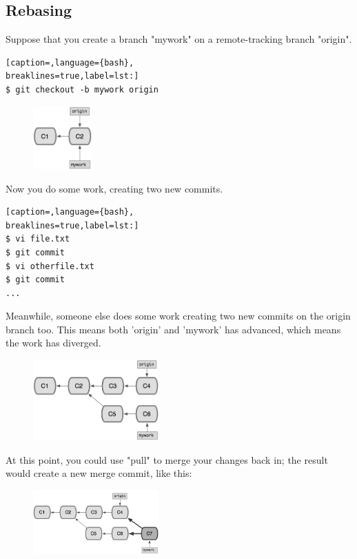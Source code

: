 \subsection{Rebasing}
Suppose that you create a branch "mywork" on a remote-tracking branch "origin".
\lstset{basicstyle=\scriptsize, numbers=none, captionpos=b, tabsize=4}
\begin{lstlisting}[caption=,language={bash},
breaklines=true,label=lst:]
$ git checkout -b mywork origin
\end{lstlisting}

\begin{figure}[h]
\centering
\includegraphics[width=0.20\textwidth]{content/git/rebase0.png}
\end{figure}

Now you do some work, creating two new commits.
\lstset{basicstyle=\scriptsize, numbers=none, captionpos=b, tabsize=4}
\begin{lstlisting}[caption=,language={bash},
breaklines=true,label=lst:]
$ vi file.txt
$ git commit
$ vi otherfile.txt
$ git commit
...
\end{lstlisting}

Meanwhile, someone else does some work creating two new commits on the origin
branch too. This means both 'origin' and 'mywork' has advanced, which means the
work has diverged.

\begin{figure}[h]
\centering
\includegraphics[width=0.43\textwidth]{content/git/rebase1.png}
\end{figure}

At this point, you could use "pull" to merge your changes back in; the result
would create a new merge commit, like this:

\begin{figure}[h]
\centering
\includegraphics[width=0.43\textwidth]{content/git/rebase2.png}
\end{figure}

